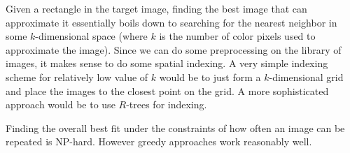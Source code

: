 Given a rectangle in the target image, finding the best image that
can approximate it essentially boils down to searching for the nearest
neighbor in some $k$-dimensional space (where $k$ is the number of
color pixels used to approximate the image). Since we can do some preprocessing on the library of images, it makes sense to do some
spatial indexing.  A very simple indexing scheme for relatively low
value of $k$ would be to just form a $k$-dimensional grid and place
the images to the closest point on the grid. A more sophisticated
approach would be to use $R$-trees for indexing.

Finding the overall best fit under the constraints of how often an
image can be repeated is NP-hard. However greedy approaches work
reasonably well.

